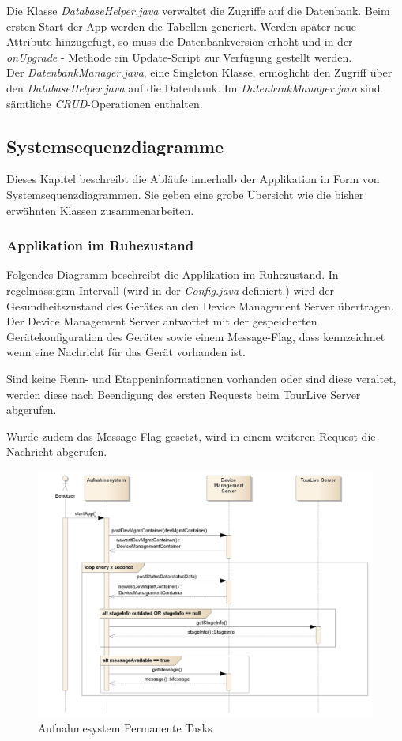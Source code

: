 Die Klasse \textit{DatabaseHelper.java} verwaltet die Zugriffe auf die Datenbank. Beim ersten Start der App werden die Tabellen generiert. Werden später neue Attribute hinzugefügt, so muss die Datenbankversion erhöht und in der \textit{onUpgrade} - Methode ein Update-Script zur Verfügung gestellt werden.\\

Der \textit{DatenbankManager.java}, eine Singleton Klasse, ermöglicht den Zugriff über den \textit{DatabaseHelper.java} auf die Datenbank. Im \textit{DatenbankManager.java} sind sämtliche \textit{\gls{CRUD}}-Operationen enthalten.

\subsection{Systemsequenzdiagramme}
Dieses Kapitel beschreibt die Abläufe innerhalb der Applikation in Form von Systemsequenzdiagrammen. Sie geben eine grobe Übersicht wie die bisher erwähnten Klassen zusammenarbeiten.

\subsubsection{Applikation im Ruhezustand}
Folgendes Diagramm beschreibt die Applikation im Ruhezustand. In regelmässigem Intervall (wird in der \textit{Config.java} definiert.) wird der Gesundheitszustand des Gerätes an den Device Management Server übertragen. Der Device Management Server antwortet mit der gespeicherten Gerätekonfiguration des Gerätes sowie einem Message-Flag, dass kennzeichnet wenn eine Nachricht für das Gerät vorhanden ist. 

Sind keine Renn- und Etappeninformationen vorhanden oder sind diese veraltet, werden diese nach Beendigung des ersten Requests beim TourLive Server abgerufen.

Wurde zudem das Message-Flag gesetzt, wird in einem weiteren Request die Nachricht abgerufen. 

 
\begin{figure}[H]
	\centering
	\includegraphics[width=150mm]{images/android/permanent_taskes.jpg}
	\caption{Aufnahmesystem Permanente Tasks}
\end{figure}

